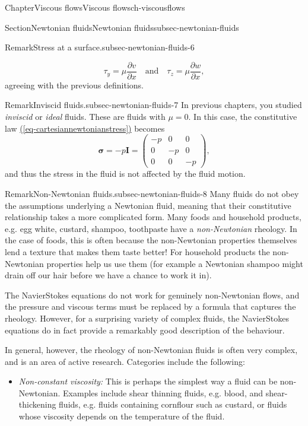 \documentclass[oneside,10pt,]{book}
\newcommand{\xreffont}{\relax}
\numberwithin{equation}{section}
\newcommand{\pd}[2]{\frac{\partial#1}{\partial#2}}
\newcommand{\bsigma}{\boldsymbol{\sigma}}
\newcommand{\bI}{\boldsymbol{I}}
\begin{document}
\begin{chapterptx}{Chapter}{Viscous flows}{}{Viscous flows}{}{}{ch-viscousflows}
\begin{sectionptx}{Section}{Newtonian fluids}{}{Newtonian fluids}{}{}{subsec-newtonian-fluids}
\begin{remark}{Remark}{Stress at a surface.}{subsec-newtonian-fluids-6}
\begin{itemize}[label=\textbullet]
\begin{equation*}
\tau_y=\mu\pd{v}{x}\quad\textrm{and}\quad\tau_z=\mu\pd{w}{x},
\end{equation*}
agreeing with the previous definitions.%
\end{itemize}
%
\end{remark}
\begin{remark}{Remark}{Inviscid fluids.}{subsec-newtonian-fluids-7}%
In previous chapters, you studied \emph{inviscid} or \emph{ideal} fluids. These are fluids with \(\mu=0\). In this case, the constitutive law \hyperref[eq-cartesiannewtonianstress]{({\xreffont\ref{eq-cartesiannewtonianstress}})} becomes%
\begin{equation}
\bsigma=-p \bI=\left(\begin{matrix}
-p&0&0\\
0&-p&0\\
0&0&-p
\end{matrix}\right),\label{eq-inviscidstress}
\end{equation}
and thus the stress in the fluid is not affected by the fluid motion.%
\end{remark}
\begin{remark}{Remark}{Non-Newtonian fluids.}{subsec-newtonian-fluids-8}%
Many fluids do not obey the assumptions underlying a Newtonian fluid, meaning that their constitutive relationship takes a more complicated form. Many foods and household products, e.g. egg white, custard, shampoo, toothpaste have a \emph{non-Newtonian} rheology. In the case of foods, this is often because the non-Newtonian properties themselves lend a texture that makes them taste better! For household products the non-Newtonian properties help us use them (for example a Newtonian shampoo might drain off our hair before we have a chance to work it in).%
\par
The Navier\textendash{}Stokes equations do not work for genuinely non-Newtonian flows, and the pressure and viscous terms must be replaced by a formula that captures the rheology. However, for a surprising variety of complex fluids, the Navier\textendash{}Stokes equations do in fact provide a remarkably good description of the behaviour.%
\par
In general, however, the rheology of non-Newtonian fluids is often very complex, and is an area of active research. Categories include the following:%
\begin{itemize}[label=\textbullet]
\item{}\emph{Non-constant viscosity:} This is perhaps the simplest way a fluid can be non-Newtonian. Examples include shear thinning fluids, e.g. blood, and shear-thickening fluids, e.g. fluids containing cornflour such as custard, or fluids whose viscosity depends on the temperature of the fluid.%

\end{itemize}
\end{remark}
\end{sectionptx}
\end{chapterptx}
\end{document}

